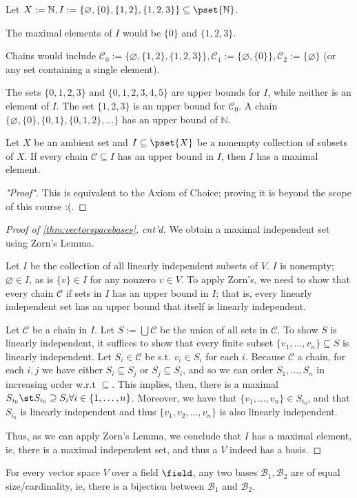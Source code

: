\begin{example}
    Let $X := \mathbb{N}, I := \{\varnothing, \{0\}, \{1, 2\}, \{1, 2, 3\}\} \subseteq \pset{\mathbb{N}}$.

    The maximal elements of $I$ would be $\{0\}$ and $\{1, 2, 3\}$.

    Chains would include $\mathcal{C}_0 := \{\varnothing, \{1, 2 \}, \{1,2,3\}\}, \mathcal{C}_1 := \{\varnothing, \{0\}\}, \mathcal{C}_2 := \{\varnothing\}$ (or any set containing a single element).

    The sets $\{0, 1, 2, 3\}$ and $\{0, 1, 2, 3, 4, 5\}$ are upper bounds for $I$, while neither is an element of $I$. The set $\{1, 2, 3\}$ is an upper bound for $\mathcal{C}_0$. A chain $\{\varnothing, \{0\}, \{0,1\}, \{0,1,2\}, \dots\}$ has an upper bound of $\mathbb{N}$.
\end{example}

\begin{lemma}\label{lemma:zorns}
    Let $X$ be an ambient set and $I \subseteq \pset{X}$ be a nonempty collection of subsets of $X$. If every chain $\mathcal{C} \subseteq I$ has an upper bound in $I$, then $I$ has a maximal element.
\end{lemma}

\begin{proof}["Proof"]
    This is equivalent to the Axiom of Choice; proving it is beyond the scope of this course :(.
\end{proof}

\begin{proof}[Proof of \cref{thm:vectorspacebases}, cnt'd]
    We obtain a maximal independent set using Zorn's Lemma.

    Let $I$ be the collection of all linearly independent subsets of $V$. $I$ is nonempty; $\varnothing \in I$, as is $\{v\} \in I$ for any nonzero $v \in V$. To apply Zorn's, we need to show that every chain $\mathcal{C}$ if sets in $I$ has an upper bound in $I$; that is, every linearly independent set has an upper bound that itself is linearly independent.

    Let $\mathcal{C}$ be a chain in $I$. Let $S := \bigcup \mathcal{C}$ be the union of all sets in $\mathcal{C}$. To show $S$ is linearly independent, it suffices to show that every finite subset $\{v_1, \dots, v_n\} \subseteq S$ is linearly independent. Let $S_i \in \mathcal{C}$ be s.t. $v_i \in S_i$ for each $i$. Because $\mathcal{C}$ a chain, for each $i,j$ we have either $S_i \subseteq S_j$ or $S_j \subseteq S_i$, and so we can order $S_1, \dots, S_n$ in increasing order w.r.t $\subseteq$. This implies, then, there is a maximal $S_{i_0} \st S_{i_0} \supseteq S_i \forall i \in \{1, \dots, n\}$. Moreover, we have that $\{v_1, \dots, v_n\} \in S_{i_0}$, and that $S_{i_0}$ is linearly independent and thus $\{v_1, v_2, \dots, v_n\}$ is also linearly independent. 

    Thus, as we can apply Zorn's Lemma, we conclude that $I$ has a maximal element, ie, there is a maximal independent set, and thus a $V$ indeed has a basis.
\end{proof}

\begin{theorem}\label{thm:basesofequalcardinality}
    For every vector space $V$ over a field $\field$, any two bases $\mathcal{B}_1,\mathcal{B}_2$ are of equal size/cardinality, ie, there is a bijection between $\mathcal{B}_1$ and $\mathcal{B}_2$.
\end{theorem}